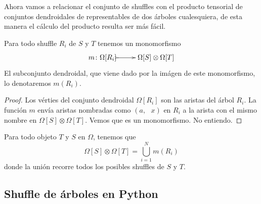 \documentclass[../main.tex]{subfiles}
\begin{document}
Ahora vamos a relacionar el conjunto de shuffles con el producto tensorial de conjuntos dendroidales de representables de dos \'arboles cualesquiera, de esta manera el c\'alculo del producto resulta ser m\'as f\'acil.
\begin{lema}
    Para todo shuffle $R_i$ de $S$ y $T$ tenemos un monomorfismo
    $$
        \xymatrix{
            m\colon\Omega[R_i] \ar@{>->}[r] & \Omega[S]\otimes\Omega[T]
        }
    $$
    El subconjunto dendroidal, que viene dado por la im\'agen de este monomorfismo, lo denotaremos $m(R_i)$.
\end{lema}
\begin{proof}
    Los v\'erties del conjunto dendroidal $\Omega[R_i]$ son las aristas del \'arbol $R_i$. La funci\'on $m$ env\'ia aristas nombradas como $(a,\text{ }x)$ en $R_i$ a la arista con el mismo nombre en $\Omega[S]\otimes\Omega[T]$.
    Vemos que es un monomorfismo.
    No entiendo.
\end{proof}
\begin{corol}
    Para todo objeto $T$ y $S$ en $\Omega$, tenemos que
    $$
        \Omega[S]\otimes\Omega[T] = \bigcup_{i=1}^{N} m(R_i)
    $$
    donde la uni\'on recorre todos los posibles shuffles de $S$ y $T$.
\end{corol}

\subsection{Shuffle de \'arboles en Python}
\end{document}
